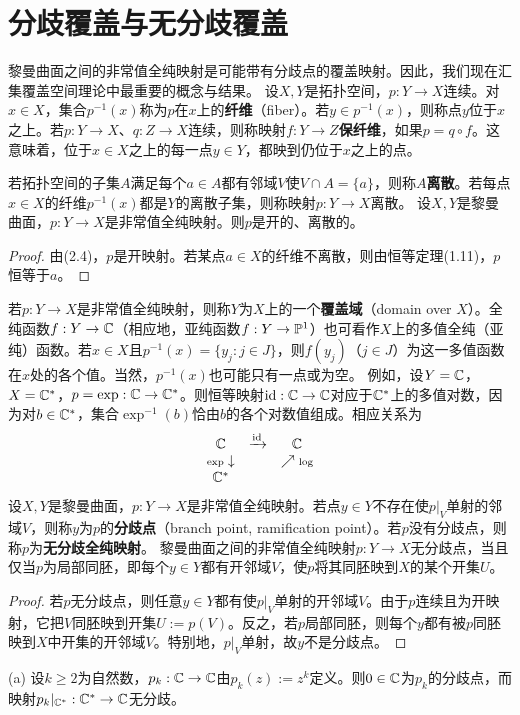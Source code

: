 \section{分歧覆盖与无分歧覆盖}
黎曼曲面之间的非常值全纯映射是可能带有分歧点的覆盖映射。因此，我们现在汇集覆盖空间理论中最重要的概念与结果。
设$X,Y$是拓扑空间，$p:Y\to X$连续。对$x\in X$，集合$p^{-1}(x)$称为$p$在$x$上的\textbf{纤维}（fiber）。若$y\in p^{-1}(x)$，则称点$y$位于$x$之上。若$p:Y\to X$、$q:Z\to X$连续，则称映射$f:Y\to Z$\textbf{保纤维}，如果$p=q\circ f$。这意味着，位于$x\in X$之上的每一点$y\in Y$，都映到仍位于$x$之上的点。

若拓扑空间的子集$A$满足每个$a\in A$都有邻域$V$使$V\cap A=\{a\}$，则称$A$\textbf{离散}。若每点$x\in X$的纤维$p^{-1}(x)$都是$Y$的离散子集，则称映射$p:Y\to X$离散。
设$X,Y$是黎曼曲面，$p:Y\to X$是非常值全纯映射。则$p$是开的、离散的。
\begin{proof}
由(2.4)，$p$是开映射。若某点$a\in X$的纤维不离散，则由恒等定理(1.11)，$p$恒等于$a$。
\end{proof}
若$p:Y\to X$是非常值全纯映射，则称$Y$为$X$上的一个\textbf{覆盖域}（domain over $X$）。全纯函数$f:Y\to\mathbb C$（相应地，亚纯函数$f:Y\to\mathbb P^1$）也可看作$X$上的多值全纯（亚纯）函数。若$x\in X$且$p^{-1}(x)=\{y_j:j\in J\}$，则$f(y_j)$（$j\in J$）为这一多值函数在$x$处的各个值。当然，$p^{-1}(x)$也可能只有一点或为空。
例如，设$Y=\mathbb C$，$X=\mathbb C^*$，$p=\exp:\mathbb C\to\mathbb C^*$。则恒等映射$\mathrm{id}:\mathbb C\to\mathbb C$对应于$\mathbb C^*$上的多值对数，因为对$b\in\mathbb C^*$，集合$\exp^{-1}(b)$恰由$b$的各个对数值组成。相应关系为
\[
\begin{array}{ccc}\mathbb C&\xrightarrow{\mathrm{id}}&\mathbb C\\ {\scriptstyle\exp}\downarrow&&\nearrow{\scriptstyle\log}\\\mathbb C^*&&\end{array}
\]
设$X,Y$是黎曼曲面，$p:Y\to X$是非常值全纯映射。若点$y\in Y$不存在使$p|_V$单射的邻域$V$，则称$y$为$p$的\textbf{分歧点}（branch point, ramification point）。若$p$没有分歧点，则称$p$为\textbf{无分歧全纯映射}。
黎曼曲面之间的非常值全纯映射$p:Y\to X$无分歧点，当且仅当$p$为局部同胚，即每个$y\in Y$都有开邻域$V$，使$p$将其同胚映到$X$的某个开集$U$。
\begin{proof}
若$p$无分歧点，则任意$y\in Y$都有使$p|_V$单射的开邻域$V$。由于$p$连续且为开映射，它把$V$同胚映到开集$U:=p(V)$。反之，若$p$局部同胚，则每个$y$都有被$p$同胚映到$X$中开集的开邻域$V$。特别地，$p|_V$单射，故$y$不是分歧点。
\end{proof}
(a) 设$k\ge2$为自然数，$p_k:\mathbb C\to\mathbb C$由$p_k(z):=z^k$定义。则$0\in\mathbb C$为$p_k$的分歧点，而映射$p_k|_{\mathbb C^*}:\mathbb C^*\to\mathbb C$无分歧。

